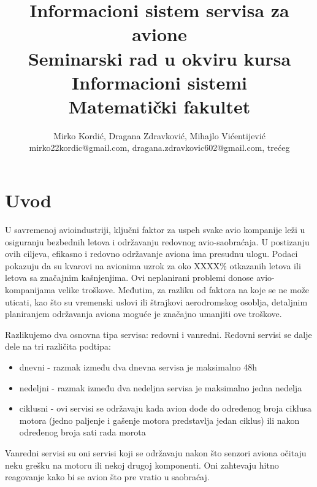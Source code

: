 \documentclass[a4paper]{article}
\begin{document}
\title{Informacioni sistem servisa za avione\\ \small{Seminarski rad u okviru kursa\\Informacioni sistemi\\ Matematički fakultet}}

\author{Mirko Kordić, Dragana Zdravković, Mihajlo Vićentijević\\ mirko22kordic@gmail.com, dragana.zdravkovic602@gmail.com, trećeg}


\maketitle

\abstract{
}

\tableofcontents

\newpage

\section{Uvod}
\label{sec:uvod}
U savremenoj avioindustriji, ključni faktor za uspeh svake avio kompanije leži u osiguranju bezbednih letova i održavanju redovnog avio-saobraćaja. U postizanju ovih ciljeva, efikasno i redovno održavanje aviona ima presudnu ulogu. Podaci pokazuju da su kvarovi na avionima uzrok za oko XXXX\% otkazanih letova ili letova sa značajnim kašnjenjima. Ovi neplanirani problemi donose avio-kompanijama velike troškove. Međutim, za razliku od faktora na koje se ne može uticati, kao što su vremenski uslovi ili štrajkovi aerodromskog osoblja, detaljnim planiranjem održavanja aviona moguće je značajno umanjiti ove troškove.

Razlikujemo dva osnovna tipa servisa: redovni i vanredni. Redovni servisi se dalje dele na tri različita podtipa:
\begin{itemize}
    \item dnevni - razmak između dva dnevna servisa je maksimalno 48h
    \item nedeljni - razmak između dva nedeljna servisa je maksimalno jedna nedelja
    \item ciklusni - ovi servisi se održavaju kada avion dođe do određenog broja ciklusa motora (jedno paljenje i gašenje motora predstavlja jedan ciklus) ili nakon određenog broja sati rada morota
\end{itemize}

Vanredni servisi su oni servisi koji se održavaju nakon što senzori aviona očitaju neku grešku na motoru ili nekoj drugoj komponenti. Oni zahtevaju hitno reagovanje kako bi se avion što pre vratio u saobraćaj. 
\end{document}
